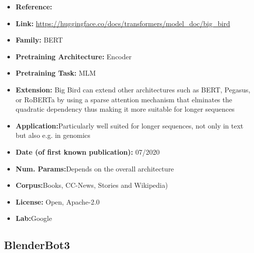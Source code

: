 \documentclass{article}
\begin{document}
            \begin{itemize}
                \item \textbf{Reference:} 
                \item \textbf{Link:} \url{https://huggingface.co/docs/transformers/model_doc/big_bird}
                \item \textbf{Family:} BERT 
                \item \textbf{Pretraining Architecture:} Encoder
                \item \textbf{Pretraining Task:} MLM
                \item \textbf{Extension:} Big Bird can extend other architectures such as BERT, Pegasus, or RoBERTa by using a sparse attention mechanism that elminates the quadratic dependency thus making it more suitable for longer sequences 
                \item \textbf{Application:}Particularly well suited for longer sequences, not only in text but also e.g. in genomics
                \item \textbf{Date (of first known publication):} 07/2020
                \item \textbf{Num. Params:}Depends on the overall architecture
                \item \textbf{Corpus:}Books, CC-News, Stories and Wikipedia)
                \item \textbf{License:} Open, Apache-2.0
                \item \textbf{Lab:}Google
            \end{itemize}

\subsection{BlenderBot3}
\end{document}
